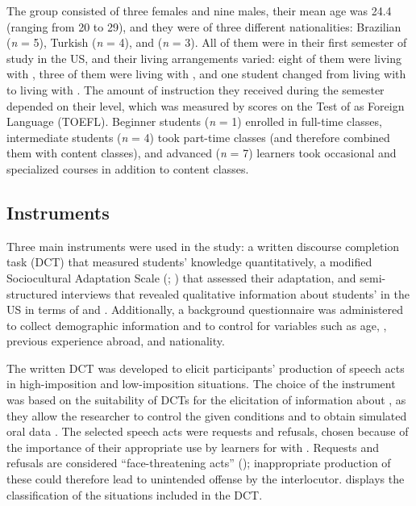 \documentclass[output=paper]{langsci/langscibook}
\begin{document}
The group consisted of three females and nine males, their mean age was 24.4 (ranging from 20 to 29), and they were of three different nationalities: Brazilian (\textit{n} = 5), Turkish (\textit{n} = 4), and  (\textit{n} = 3). All of them were in their first semester of study in the US, and their living arrangements varied: eight of them were living with , three of them were living with , and one student changed from living with  to living with . The amount of  instruction they received during the semester depended on their  level, which was measured by scores on the Test of  as Foreign Language (TOEFL). Beginner students (\textit{n} = 1) enrolled in full-time  classes, intermediate students (\textit{n} = 4) took part-time classes (and therefore combined them with content classes), and advanced (\textit{n} = 7) learners took occasional and specialized  courses in addition to content classes.


\subsection{Instruments} 
Three main instruments were used in the study: a written discourse completion task (DCT) that measured students’  knowledge quantitatively, a modified Sociocultural Adaptation Scale (; \citealt{WardKennedy1999}) that assessed their  adaptation, and semi-structured interviews that revealed qualitative information about students’  in the US in terms of  and . Additionally, a background questionnaire was administered to collect demographic information and to control for variables such as age, , previous experience abroad, and nationality. 

The written DCT was developed to elicit participants’ production of speech acts in high-imposition and low-imposition situations. The choice of the instrument was based on the suitability of DCTs for the elicitation of information about , as they allow the researcher to control the given conditions and to obtain simulated oral data \citep{Félix-BrasdeferHasler-Baker2017}. The selected speech acts were requests and refusals, chosen because of the importance of their appropriate use by  learners for  with . Requests and refusals are considered “face-threatening acts” (\citealt{BrownLevinson1987}); inappropriate production of these could therefore lead to unintended offense by the interlocutor.  displays the classification of the  situations included in the DCT. 
\end{document}
